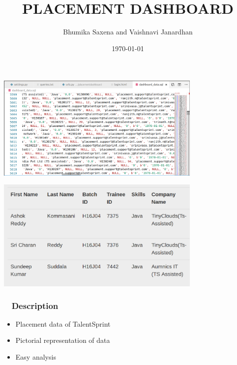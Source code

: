 \documentclass[xcolor={dvipsnames}]{beamer}
\title[Placement Dashboard]{PLACEMENT DASHBOARD}
\author[Bhumika, Vaishnavi]{Bhumika Saxena and Vaishnavi Janardhan}
\institute{TalentSprint WE}
\date{\today}
\begin{document}
\begin{frame}[plain]
\begin{center}
\includegraphics[width = 10cm]{1.png}
\end{center}
\end{frame}

\begin{frame}[plain]
\begin{center}
\includegraphics[width = 10cm]{2.png}
\end{center}
\end{frame}


\begin{frame}
\titlepage %
\end{frame}


\begin{frame}
\frametitle{~ Description}
\begin {itemize}
\item{Placement data of TalentSprint}
\item{Pictorial representation of data}
\item{Easy analysis}
\end{itemize}
\end{frame}
\end{document}
